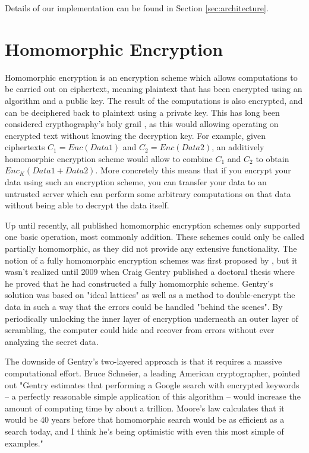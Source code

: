 Details of our implementation can be found in Section \ref{sec:architecture}.

\section{Homomorphic Encryption}\label{sec:homomorphic_encryption}
Homomorphic encryption is an encryption scheme which allows computations to be carried out on ciphertext, meaning plaintext that has been encrypted using an algorithm and a public key. The result of the computations is also encrypted, and can be deciphered back to plaintext using a private key. This has long been considered crypthography's holy grail \citep{Micciancio2011HomoEnc}, as this would allowing operating on encrypted text without knowing the decryption key. For example, given ciphertexts $C_1=Enc(Data1)$ and $C_2=Enc(Data2)$, an additively homomorphic encryption scheme would allow to combine $C_1$ and $C_2$ to obtain $Enc_K(Data1+Data2)$. More concretely this means that if you encrypt your data using such an encryption scheme, you can transfer your data to an untrusted server which can perform some arbitrary computations on that data without being able to decrypt the data itself.

Up until recently, all published homomorphic encryption schemes only supported one basic operation, most commonly addition. These schemes could only be called partially homomorphic, as they did not provide any extensive functionality. The notion of a  fully homomorphic encryption schemes was first proposed by \cite{rivest1978data}, but it wasn't realized until 2009 when Craig Gentry published a doctoral thesis where he proved that he had constructed a fully homomorphic scheme\cite{gentry2009FHEpaper}. Gentry's solution was based on "ideal lattices" as well as a method to double-encrypt the data in such a way that the errors could be handled "behind the scenes". By periodically unlocking the inner layer of encryption underneath an outer layer of scrambling, the computer could hide and recover from errors without ever analyzing the secret data. 


The downside of Gentry's two-layered approach is that it requires a massive computational effort. Bruce Schneier, a leading American cryptographer, pointed out "Gentry estimates that performing a Google search with encrypted keywords -- a perfectly reasonable simple application of this algorithm -- would increase the amount of computing time by about a trillion. Moore's law calculates that it would be 40 years before that homomorphic search would be as efficient as a search today, and I think he's being optimistic with even this most simple of examples\citep{schneier2009blog}." 




\cleardoublepage
